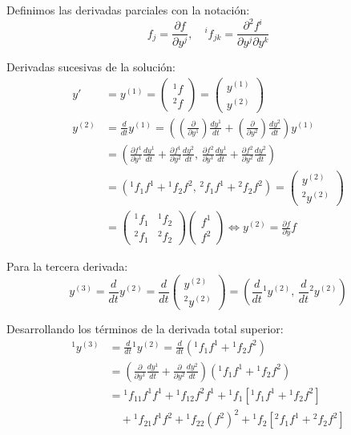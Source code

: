 Definimos las derivadas parciales con la notación:
$$ f_j = \frac{\partial f}{\partial y^j}, \quad {^i}f_{jk} = \frac{\partial^2 f^i}{\partial y^j \partial y^k} $$

Derivadas sucesivas de la solución:
\begin{align*}
    y' &= y^{(1)} = \begin{pmatrix} {^1}f \\ {^2}f \end{pmatrix} = \begin{pmatrix} y^{(1)} \\ y^{(2)} \end{pmatrix} \\
    y^{(2)} &= \frac{d}{dt} y^{(1)} = \left( \left(\frac{\partial}{\partial y^1}\right) \frac{dy^1}{dt} + \left(\frac{\partial}{\partial y^2}\right) \frac{dy^2}{dt} \right) y^{(1)} \\
    &= \left( \frac{\partial f^1}{\partial y^1}\frac{dy^1}{dt} + \frac{\partial f^1}{\partial y^2}\frac{dy^2}{dt}, \, \frac{\partial f^2}{\partial y^1}\frac{dy^1}{dt} + \frac{\partial f^2}{\partial y^2}\frac{dy^2}{dt} \right) \\
    &= \left( {^1}f_1 f^1 + {^1}f_2 f^2, \, {^2}f_1 f^1 + {^2}f_2 f^2 \right) = \begin{pmatrix} y^{(2)} \\ {^2}y^{(2)} \end{pmatrix} \\
    &= \begin{pmatrix} 
        {^1}f_1 & {^1}f_2 \\ 
        {^2}f_1 & {^2}f_2 
    \end{pmatrix} \begin{pmatrix} f^1 \\ f^2 \end{pmatrix} \iff y^{(2)} = \frac{\partial f}{\partial y} f
\end{align*}

Para la tercera derivada:
$$ y^{(3)} = \frac{d}{dt} y^{(2)} = \frac{d}{dt} \begin{pmatrix} y^{(2)} \\ {^2}y^{(2)} \end{pmatrix} = \left( \frac{d}{dt} {^1}y^{(2)}, \, \frac{d}{dt} {^2}y^{(2)} \right) $$

Desarrollando los términos de la derivada total superior:
\begin{align*}
    {^1}y^{(3)} &= \frac{d}{dt} {^1}y^{(2)} = \frac{d}{dt} \left( {^1}f_1 f^1 + {^1}f_2 f^2 \right) \\
    &= \left( \frac{\partial}{\partial y^1} \frac{dy^1}{dt} + \frac{\partial}{\partial y^2} \frac{dy^2}{dt} \right) ({^1}f_1 f^1 + {^1}f_2 f^2) \\
    &= {^1}f_{11} f^1 f^1 + {^1}f_{12} f^2 f^1 + {^1}f_1 \left[ {^1}f_1 f^1 + {^1}f_2 f^2 \right] \\
    &\quad + {^1}f_{21} f^1 f^2 + {^1}f_{22} (f^2)^2 + {^1}f_2 \left[ {^2}f_1 f^1 + {^2}f_2 f^2 \right]
\end{align*}

